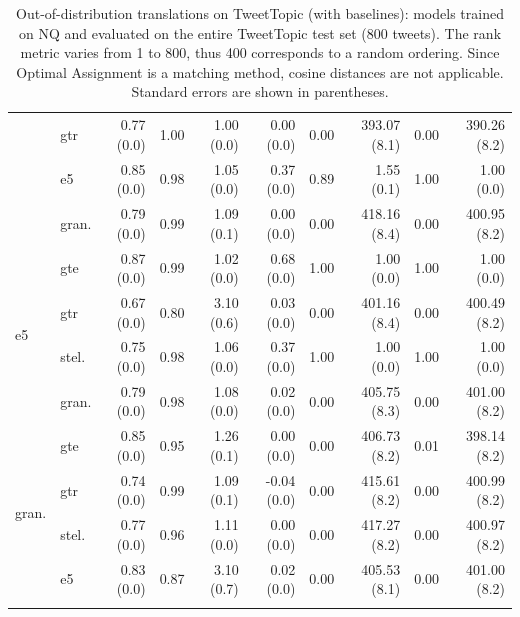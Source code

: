 \begin{table}[!ht]
\begin{tabular}{llrrrrrrrr}
        & gtr & 0.77 {\tiny (0.0)} & 1.00 & 1.00 {\tiny (0.0)} & 0.00 {\tiny (0.0)} & 0.00 & 393.07 {\tiny (8.1)} & 0.00 & 390.26 {\tiny (8.2)} \\
        & e5 & 0.85 {\tiny (0.0)} & 0.98 & 1.05 {\tiny (0.0)} & 0.37 {\tiny (0.0)} & 0.89 & 1.55 {\tiny (0.1)} & 1.00 & 1.00 {\tiny (0.0)} \\
        & gran. & 0.79 {\tiny (0.0)} & 0.99 & 1.09 {\tiny (0.1)} & 0.00 {\tiny (0.0)} & 0.00 & 418.16 {\tiny (8.4)} & 0.00 & 400.95 {\tiny (8.2)} \\
        \midrule
        \multirow{4}{*}{e5} & gte & 0.87 {\tiny (0.0)} & 0.99 & 1.02 {\tiny (0.0)} & 0.68 {\tiny (0.0)} & 1.00 & 1.00 {\tiny (0.0)} & 1.00 & 1.00 {\tiny (0.0)} \\
        & gtr & 0.67 {\tiny (0.0)} & 0.80 & 3.10 {\tiny (0.6)} & 0.03 {\tiny (0.0)} & 0.00 & 401.16 {\tiny (8.4)} & 0.00 & 400.49 {\tiny (8.2)} \\
        & stel. & 0.75 {\tiny (0.0)} & 0.98 & 1.06 {\tiny (0.0)} & 0.37 {\tiny (0.0)} & 1.00 & 1.00 {\tiny (0.0)} & 1.00 & 1.00 {\tiny (0.0)} \\
        & gran. & 0.79 {\tiny (0.0)} & 0.98 & 1.08 {\tiny (0.0)} & 0.02 {\tiny (0.0)} & 0.00 & 405.75 {\tiny (8.3)} & 0.00 & 401.00 {\tiny (8.2)} \\
        \midrule
        \multirow{4}{*}{gran.} & gte & 0.85 {\tiny (0.0)} & 0.95 & 1.26 {\tiny (0.1)} & 0.00 {\tiny (0.0)} & 0.00 & 406.73 {\tiny (8.2)} & 0.01 & 398.14 {\tiny (8.2)} \\
        & gtr & 0.74 {\tiny (0.0)} & 0.99 & 1.09 {\tiny (0.1)} & -0.04 {\tiny (0.0)} & 0.00 & 415.61 {\tiny (8.2)} & 0.00 & 400.99 {\tiny (8.2)} \\
        & stel. & 0.77 {\tiny (0.0)} & 0.96 & 1.11 {\tiny (0.0)} & 0.00 {\tiny (0.0)} & 0.00 & 417.27 {\tiny (8.2)} & 0.00 & 400.97 {\tiny (8.2)} \\
        & e5 & 0.83 {\tiny (0.0)} & 0.87 & 3.10 {\tiny (0.7)} & 0.02 {\tiny (0.0)} & 0.00 & 405.53 {\tiny (8.1)} & 0.00 & 401.00 {\tiny (8.2)} \\
        \bottomrule\\[-1.6ex]
    \end{tabular}
    \caption{Out-of-distribution translations on TweetTopic (with baselines): \atk{} models trained on NQ and evaluated on the entire TweetTopic test set (800 tweets). The rank metric varies from 1 to 800, thus 400 corresponds to a random ordering. Since Optimal Assignment is a matching method, cosine distances are not applicable.  Standard errors are shown in parentheses.}
    \label{tab:embedding_comparison_ood}
\end{table}

